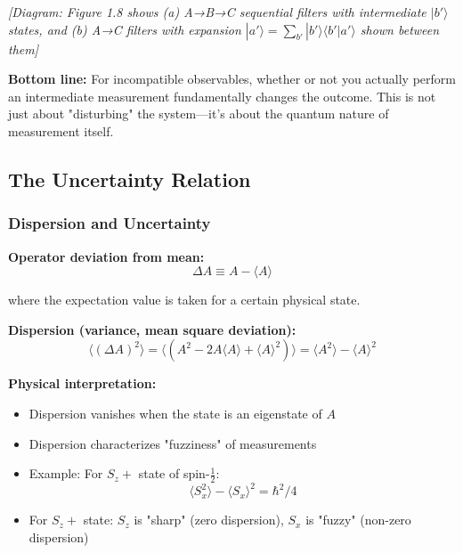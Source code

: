 \documentclass[11pt,a4paper]{article}
\begin{document}
\begin{center}
\textit{[Diagram: Figure 1.8 shows (a) A→B→C sequential filters with intermediate $|b'\rangle$ states, and (b) A→C filters with expansion $|a'\rangle = \sum_{b'}|b'\rangle\langle b'|a'\rangle$ shown between them]}
\end{center}

\textbf{Bottom line:} For incompatible observables, whether or not you actually perform an intermediate measurement fundamentally changes the outcome. This is not just about "disturbing" the system—it's about the quantum nature of measurement itself.

\subsection{The Uncertainty Relation}

\subsubsection{Dispersion and Uncertainty}

\textbf{Operator deviation from mean:}
\begin{equation}
\Delta A \equiv A - \langle A \rangle
\tag{1.143}
\end{equation}

where the expectation value is taken for a certain physical state.

\textbf{Dispersion (variance, mean square deviation):}
\begin{equation}
\langle(\Delta A)^2\rangle = \langle(A^2 - 2A\langle A \rangle + \langle A \rangle^2)\rangle = \langle A^2 \rangle - \langle A \rangle^2
\tag{1.144}
\end{equation}

\textbf{Physical interpretation:}
\begin{itemize}
\item Dispersion vanishes when the state is an eigenstate of $A$
\item Dispersion characterizes "fuzziness" of measurements
\item Example: For $S_z+$ state of spin-$\frac{1}{2}$:
\begin{equation}
\langle S_x^2 \rangle - \langle S_x \rangle^2 = \hbar^2/4
\tag{1.145}
\end{equation}
\item For $S_z+$ state: $S_z$ is "sharp" (zero dispersion), $S_x$ is "fuzzy" (non-zero dispersion)
\end{itemize}
\end{document}
